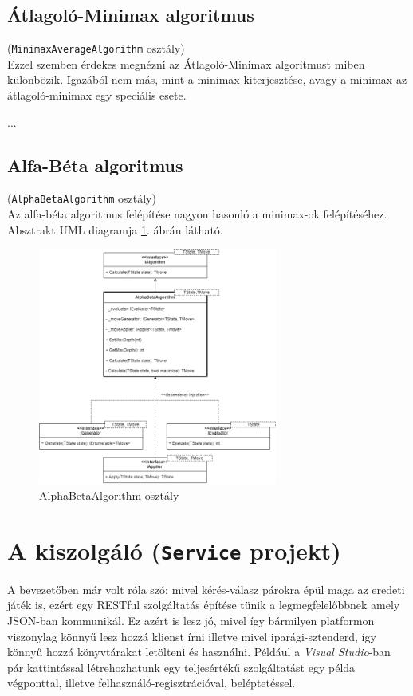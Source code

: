 \documentclass[twoside, a4paper, 12pt]{book}
\begin{document}
\subsection{Átlagoló-Minimax algoritmus}
\noindent(\texttt{MinimaxAverageAlgorithm} osztály) \\
Ezzel szemben érdekes megnézni az Átlagoló-Minimax algoritmust miben különbözik. Igazából nem más, mint a minimax kiterjesztése, avagy a minimax az átlagoló-minimax egy speciális esete.

...

\subsection{Alfa-Béta algoritmus}
\noindent(\texttt{AlphaBetaAlgorithm} osztály) \\
Az alfa-béta algoritmus felépítése nagyon hasonló a minimax-ok felépítéséhez. Absztrakt UML diagramja \ref{fig:alphaBetaAbstractDiagram}. ábrán látható.

\begin{figure}[htbp]
	\centering
	\includegraphics[width=0.7\textwidth]{img/alphabetaAbstractDiagram.png}
	\caption{AlphaBetaAlgorithm osztály}
	\label{fig:alphaBetaAbstractDiagram}
\end{figure}
 
\section{A kiszolgáló (\texttt{Service} projekt)}
A bevezetőben már volt róla szó: mivel kérés-válasz párokra épül maga az eredeti játék is, ezért egy RESTful szolgáltatás építése tünik a legmegfelelőbbnek amely JSON-ban kommunikál. Ez azért is lesz jó, mivel így bármilyen platformon viszonylag könnyű lesz hozzá klienst írni illetve mivel iparági-sztenderd, így könnyű hozzá könyvtárakat letölteni és használni. Például a \textit{Visual Studio}-ban pár kattintással létrehozhatunk egy teljesértékű szolgáltatást egy példa végponttal, illetve felhasználó-regisztrációval, beléptetéssel.
\end{document}
